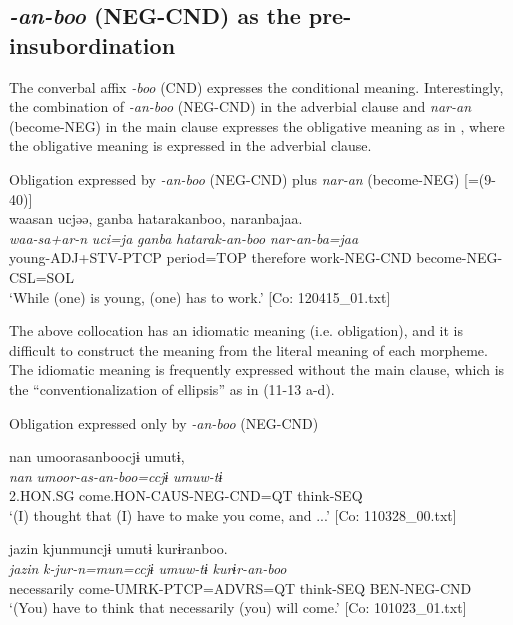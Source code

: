 \subsection{\textit{{}-an-boo} (NEG-CND) as the pre-insubordination}\label{sec:11.2.4}

The converbal affix \textit{{}-boo} (CND) expresses the conditional meaning. Interestingly, the combination of \textit{{}-an-boo} (NEG-CND) in the adverbial clause and \textit{nar-an} (become-NEG) in the main clause expresses the obligative meaning as in , where the obligative meaning is expressed in the adverbial clause.

\ea\label{ex:11-12}  Obligation expressed by \textit{{}-an-boo} (NEG-CND) plus \textit{nar-an} (become-NEG) [=(9-40)]\\
  
      \glll    waasan  ucjəə,  ganba  hatarakanboo, naranbajaa.\\
    \textit{waa-sa+ar-n}  \textit{uci=ja}  \textit{ganba}  \textit{hatarak-an-boo} \textit{nar-an{}-ba=jaa}\\
    young-ADJ+STV-PTCP  period=TOP  therefore  work-NEG-CND  become-NEG-CSL=SOL\\    
    ‘While (one) is young, (one) has to work.’     [Co: 120415\_01.txt]
\z

The above collocation has an idiomatic meaning (i.e. obligation), and it is difficult to construct the meaning from the literal meaning of each morpheme. The idiomatic meaning is frequently expressed without the main clause, which is the “conventionalization of ellipsis” \citep[372-373]{Evans2007} as in (11-13 a-d).

\ea\label{ex:11-13}  Obligation expressed only by \textit{{}-an-boo} (NEG-CND)

  \ea\relax  [= (8-122 b)]

    
      \glll    nan  umoorasanboocjɨ  umutɨ,\\
      \textit{nan}  \textit{umoor-as-an-boo=ccjɨ}  \textit{umuw-tɨ}\\
      2.HON.SG  come.HON-CAUS-NEG-CND=QT  think-SEQ\\
      \glt       ‘(I) thought that (I) have to make you come, and ...’ [Co: 110328\_00.txt]

  \ex\relax[= (10-33)]

    
      \glll    jazin  kjunmuncjɨ  umutɨ  kurɨranboo.\\
      \textit{jazin}  \textit{k-jur-n=mun=ccjɨ}  \textit{umuw-tɨ}  \textit{kurɨr-an-boo}\\
      necessarily  come-UMRK-PTCP=ADVRS=QT  think-SEQ  BEN-NEG-CND\\
      \glt       ‘(You) have to think that necessarily (you) will come.’ [Co: 101023\_01.txt]

